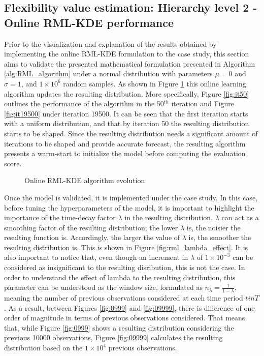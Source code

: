 \subsection{Flexibility value estimation: Hierarchy level 2 - Online RML-KDE performance}\label{Sect:ResultRMLalgorithm}

Prior to the visualization and explanation of the results obtained by implementing the online RML-KDE formulation to the case study, this section aims to validate the presented mathematical formulation presented in Algorithm \ref{alg:RML_algorithm} under a normal distribution with parameters $\mu = 0$ and $\sigma = 1$, and $1 \times 10^{6}$ random samples. As shown in Figure \ref{fig:rml_evolution} this online learning algorithm updates the resulting distribution.  More specifically, Figure \ref{fig:it50} outlines the performance of the algorithm in the 50$^{th}$ iteration and Figure \ref{fig:it19500} under iteration 19500. It can be seen that the first iteration starts with a uniform distribution, and that by iteration 50 the resulting distribution starts to be shaped. Since the resulting distribution needs a significant amount of iterations to be shaped and provide accurate forecast, the resulting algorithm presents a warm-start to initialize the model before computing the evaluation score.

\begin{figure}[ht!]
\centering     %
{}
\caption{Online RML-KDE algorithm evolution}
\label{fig:rml_evolution}
\end{figure}

Once the model is validated, it is implemented under the case study. In this case, before tuning the hyperparameters of the model, it is important to highlight the importance of the time-decay factor $\lambda$ in the resulting distribution. $\lambda$ can act as a smoothing factor of the resulting distribution; the lower $\lambda$ is, the noisier the resulting function is. Accordingly, the larger the value of $\lambda$ is, the smoother the resulting distribution is. This is shown in Figure \ref{fig:rml_lambda_effect}. It is also important to notice that, even though an increment in $\lambda$ of $1 \times 10^{-3}$ can be considered as insignificant to the resulting disribution, this is not the case. In order to understand the effect of lambda to the resulting distribution, this parameter can be understood as the window size, formulated as $n_{\lambda} = \frac{1}{1-\lambda}$, meaning the number of previous observations considered at each time period $t in T$. As a result, between Figures \ref{fig:0999} and \ref{fig:09999}, there is difference of one order of magnitude in terms of previous observations considered. That means that, while Figure \ref{fig:0999} shows a resulting distribution considering the previous 10000 observations, Figure \ref{fig:09999} calculates the resulting distribution based on the $1 \times 10^{4}$ previous observations. 

